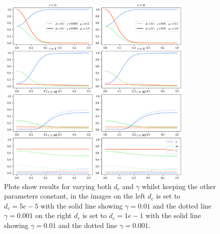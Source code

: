 \begin{figure}[h]
    \centering
    \includegraphics[width=0.85\textwidth]{resources/images/prolif_dc_gamma_mu1_2.png}
    \caption{Plots show results for varying both $d_c$ and $\gamma$ whilst keeping the other parameters constant, in the images on the left $d_c$ is set to $d_c=5e-5$ with the solid line showing $\gamma = 0.01$ and the dotted line $\gamma=0.001$ on the right $d_c$ is set to $d_c=1e-1$ with the solid line showing $\gamma = 0.01$ and the dotted line $\gamma=0.001$.}
    \label{fig:dc_gamma_variation}
\end{figure}

